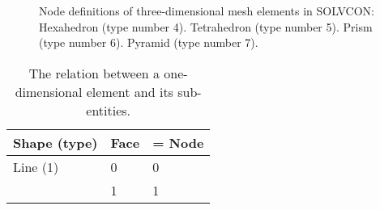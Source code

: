 \documentclass[11pt,dvips]{article}
\newcommand{\topcaption}{%
\setlength{\abovecaptionskip}{0pt}%
\setlength{\belowcaptionskip}{10pt}%
\caption}
\numberwithin{equation}{section}
\begin{document}
%
\begin{figure}
\centering
{}

\caption{
%
Node definitions of three-dimensional mesh elements in SOLVCON:
%
 Hexahedron (type number 4).
%
 Tetrahedron (type number 5).
%
 Prism (type number 6).
%
 Pyramid (type number 7).
%
}

\label{f:elm3d}
\end{figure}
%

%
\begin{table}
\centering

\topcaption{
%
The relation between a one-dimensional element and its sub-entities.
%
}

\label{t:subent1d}
\begin{tabular}{lll}
\toprule
Shape (type) & Face & = Node \\
\midrule
Line (1)     & 0    & 0      \\
             & 1    & 1      \\
\bottomrule
\end{tabular}
\end{table}
%
\end{document}
